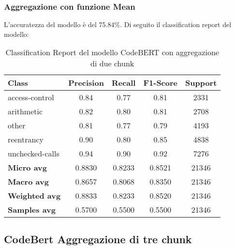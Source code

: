 \documentclass[../../Thesis.tex]{subfiles}
\begin{document}
\subsubsection{Aggregazione con funzione Mean}
L'accuratezza del modello è del 75.84\%. Di seguito il classification report del modello:
\begin{table}[H]
    \centering
    \small
    \begin{tabular}{lcccc}
    \hline
    \textbf{Class} & \textbf{Precision} & \textbf{Recall} & \textbf{F1-Score} & \textbf{Support} \\
    \hline
    access-control & 0.84 & 0.77 & 0.81 & 2331 \\
    arithmetic & 0.82 & 0.80 & 0.81 & 2708 \\
    other & 0.81 & 0.77 & 0.79 & 4193 \\
    reentrancy & 0.90 & 0.80 & 0.85 & 4838 \\
    unchecked-calls & 0.94 & 0.90 & 0.92 & 7276 \\
    \hline
    \textbf{Micro avg} & 0.8830 & 0.8233 & 0.8521 & 21346 \\
    \textbf{Macro avg} & 0.8657 & 0.8068 & 0.8350 & 21346 \\
    \textbf{Weighted avg} & 0.8833 & 0.8233 & 0.8520 & 21346 \\
    \textbf{Samples avg} & 0.5700 & 0.5500 & 0.5500 & 21346 \\
    \hline
    \end{tabular}
    \caption{Classification Report del modello CodeBERT con aggregazione di due chunk}
    \end{table}


    
\subsection{CodeBert Aggregazione di tre chunk}
\end{document}
